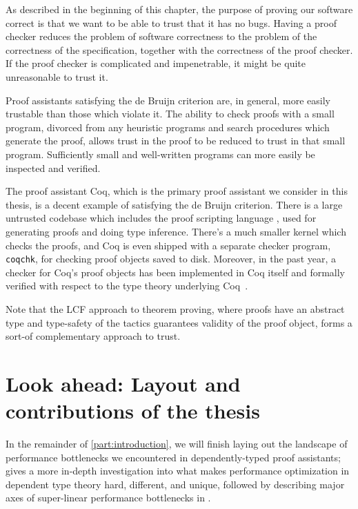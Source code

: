 As described in the beginning of this chapter, the purpose of proving our software correct is that we want to be able to trust that it has no bugs.
Having a proof checker reduces the problem of software correctness to the problem of the correctness of the specification, together with the correctness of the proof checker.
If the proof checker is complicated and impenetrable, it might be quite unreasonable to trust it.

Proof assistants satisfying the de Bruijn criterion are, in general, more easily trustable than those which violate it.
The ability to check proofs with a small program, divorced from any heuristic programs and search procedures which generate the proof, allows trust in the proof to be reduced to trust in that small program.
Sufficiently small and well-written programs can more easily be inspected and verified.


The proof assistant Coq, which is the primary proof assistant we consider in this thesis, is a decent example of satisfying the de Bruijn criterion.
There is a large untrusted codebase which includes the proof scripting language \Ltac, used for generating proofs and doing type inference.
There's a much smaller kernel which checks the proofs, and Coq is even shipped with a separate checker program, \texttt{coqchk}, for checking proof objects saved to disk.
Moreover, in the past year, a checker for Coq's proof objects has been implemented in Coq itself and formally verified with respect to the type theory underlying Coq~\cite{Coq2019Sozeau}.

Note that the LCF approach to theorem proving, where proofs have an abstract type and type-safety of the tactics guarantees validity of the proof object, forms a sort-of complementary approach to trust.


\section{Look ahead: Layout and contributions of the thesis}\label{sec:intro:layout}
In the remainder of \autoref{part:introduction}, we will finish laying out the landscape of performance bottlenecks we encountered in dependently-typed proof assistants;
 gives a more in-depth investigation into what makes performance optimization in dependent type theory hard, different, and unique, followed by describing major axes of super-linear performance bottlenecks in .

